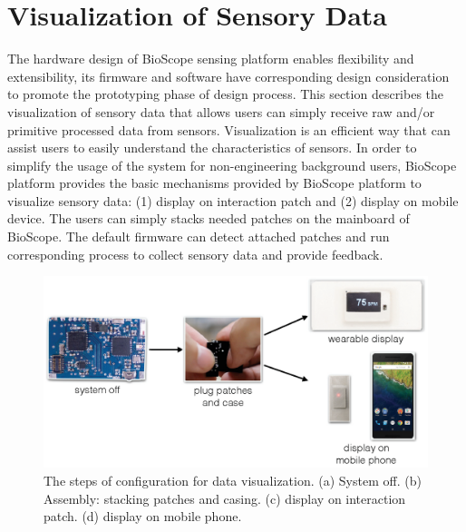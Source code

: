 



\section{Visualization of Sensory Data}
The hardware design of BioScope sensing platform enables flexibility and extensibility, its firmware and software have corresponding design consideration to promote the prototyping phase of design process. This section describes the visualization of sensory data that allows users can simply receive raw and/or primitive processed data from sensors. Visualization is an efficient way that can assist users to easily understand the characteristics of sensors. 
In order to simplify the usage of the system for non-engineering background users, BioScope platform provides the basic mechanisms provided by BioScope platform to visualize sensory data: (1) display on interaction patch and (2) display on mobile device. The users can simply stacks needed patches on the mainboard of BioScope. The default firmware can detect attached patches and run corresponding process to collect sensory data and provide feedback.

\begin{figure}
\centering
\includegraphics[width=15cm]{image/fig_config.ps}
\caption{The steps of configuration for data visualization. (a) System off. (b) Assembly: stacking patches and casing. (c) display on interaction patch. (d) display on mobile phone.}
\label{fig_config}
\end{figure}

